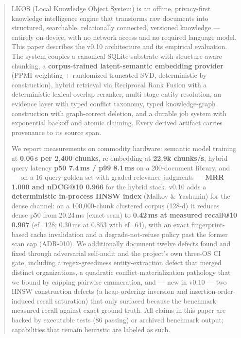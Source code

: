 \begin{abstract}
\noindent
LKOS (Local Knowledge Object System) is an offline, privacy-first knowledge
intelligence engine that transforms raw documents into structured, searchable,
relationally connected, versioned knowledge --- entirely on-device, with no
network access and no required language model. This paper describes the v0.10
architecture and its empirical evaluation. The system couples a canonical
SQLite substrate with structure-aware chunking, a \textbf{corpus-trained
latent-semantic embedding provider} (PPMI weighting + randomized truncated
SVD, deterministic by construction), hybrid retrieval via Reciprocal Rank
Fusion with a deterministic lexical-overlap reranker, multi-stage entity
resolution, an evidence layer with typed conflict taxonomy, typed
knowledge-graph construction with graph-correct deletion, and a durable job
system with exponential backoff and atomic claiming. Every derived artifact
carries provenance to its source span.

We report measurements on commodity hardware: semantic model training at
\textbf{0.06\,s per 2,400 chunks}, re-embedding at \textbf{22.9k chunks/s},
hybrid query latency \textbf{p50 7.4\,ms / p99 8.1\,ms} on a 200-document
library, and --- on a 16-query golden set with graded relevance judgments ---
\textbf{MRR 1.000 and nDCG@10 0.966} for the hybrid stack. v0.10 adds a
\textbf{deterministic in-process HNSW index} (Malkov \& Yashunin) for the
dense channel: on a 100,000-chunk clustered corpus (128-d) it reduces dense
p50 from 20.24\,ms (exact scan) to \textbf{0.42\,ms at measured recall@10
0.967} (ef=128; 0.30\,ms at 0.853 with ef=64), with an exact fingerprint-based
cache invalidation and a degrade-not-refuse policy past the former scan cap
(ADR-010). We additionally document twelve defects found and fixed through
adversarial self-audit and the project's own three-OS CI gate, including a
regex-greediness entity-extraction defect that merged distinct organizations,
a quadratic conflict-materialization pathology that we bound by capping
pairwise enumeration, and --- new in v0.10 --- two HNSW construction defects
(a heap-ordering inversion and insertion-order-induced recall saturation) that
only surfaced because the benchmark measured recall against exact ground
truth. All claims in this paper are backed by executable tests (86 passing) or
archived benchmark output; capabilities that remain heuristic are labeled as
such.
\end{abstract}

\needspace{0.2\textheight}
